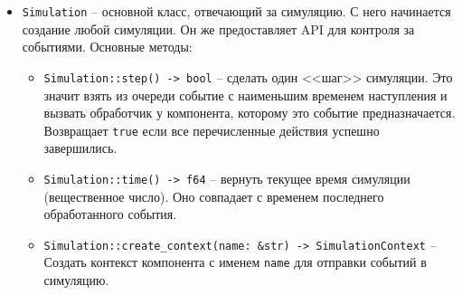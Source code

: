 \begin{itemize}
    \item \texttt{Simulation} \label{Simulation} -- основной класс, отвечающий за симуляцию. С него начинается создание любой симуляции. Он же предоставляет API для контроля за событиями. Основные методы:
    \begin{itemize}
        \item \label{Simulation::step} \texttt{Simulation::step() -> bool} -- сделать один <<шаг>> симуляции. Это значит взять из очереди событие с наименьшим временем наступления и вызвать обработчик у компонента, которому это событие предназначается. Возвращает \texttt{true} если все перечисленные действия успешно завершились. 
        \item \texttt{Simulation::time() -> f64} -- вернуть текущее время симуляции (вещественное число). Оно совпадает с временем последнего обработанного события. 
        \item \label{Simulation::createcontext} \texttt{Simulation::create\_context(name: \&str) -> SimulationContext} -- Создать контекст компонента с именем \texttt{name} для отправки событий в симуляцию.
    

\end{itemize}
\end{itemize}
